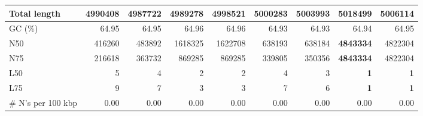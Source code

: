 \documentclass[12pt,a4paper]{article}
\begin{document}
\begin{table}[ht]
\begin{center}
\begin{tabular}{|l*{8}{|r}|}
Total length & 4990408 & 4987722 & 4989278 & 4998521 & 5000283 & 5003993 & {\bf 5018499} & 5006114 \\ \hline
GC (\%) & 64.95 & 64.95 & 64.96 & 64.96 & 64.93 & 64.93 & 64.94 & 64.95 \\ \hline
N50 & 416260 & 483892 & 1618325 & 1622708 & 638193 & 638184 & {\bf 4843334} & 4822304 \\ \hline
N75 & 216618 & 363732 & 869285 & 869285 & 339805 & 350356 & {\bf 4843334} & 4822304 \\ \hline
L50 & 5 & 4 & 2 & 2 & 4 & 3 & {\bf 1} & {\bf 1} \\ \hline
L75 & 9 & 7 & 3 & 3 & 7 & 6 & {\bf 1} & {\bf 1} \\ \hline
\# N's per 100 kbp & 0.00 & 0.00 & 0.00 & 0.00 & 0.00 & 0.00 & 0.00 & 0.00 \\ \hline
\end{tabular}
\end{center}
\end{table}
\end{document}
